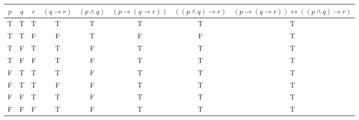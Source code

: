\documentclass[11pt]{article}
\begin{document}
	\begin{center}
	\begin{tabular}{|c|c|c|c|c|c|c|c|}\hline
	$p$ & $q$ & $r$ & $(q \to r)$ & $(p \land  q)$ & $(p \to (q \to r))$& $((p \land q) \to r)$ & $(p \to (q \to r)) \leftrightarrow ((p \land q) \to r)$ \\ \hline
	
	T & T & T & T & T & T & T & T \\ \hline
	T & T & F & F & T & F & F & T \\ \hline
	T & F & T & T & F & T & T & T \\ \hline
	T & F & F & T & F & T & T & T \\ \hline
	F & T & T & T & F & T & T & T \\ \hline
	F & T & T & F & F & T & T & T \\ \hline
	F & F & T & T & F & T & T & T \\ \hline
	F & F & F & T & F & T & T & T \\ \hline
	\end{tabular}
	\end{center}
	
\end{document}
